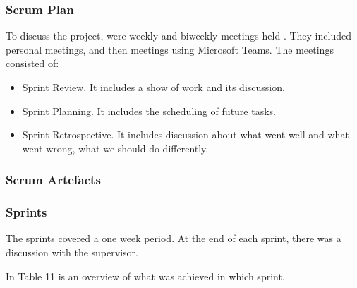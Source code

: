 \documentclass{scrartcl}
\begin{document}
  	    \subsubsection{Scrum Plan}
  	    To discuss the project, were weekly and biweekly meetings held . They included personal meetings, and then meetings using Microsoft Teams. The meetings consisted of:
  	    \begin{itemize}
  	    \item Sprint Review. It includes a show of work and its discussion.
  	    \item Sprint Planning. It includes the scheduling of future tasks.
  	    \item Sprint Retrospective. It includes discussion about what went well and what went wrong, what we should do differently. 
  	    \end{itemize}
  		\subsubsection{Scrum Artefacts }
  		
  		\subsubsection{Sprints}
  		
	The sprints covered a one week period. At the end of each sprint, there was a discussion with the supervisor.

In Table 11 is an overview of what was achieved in which sprint.
\end{document}
